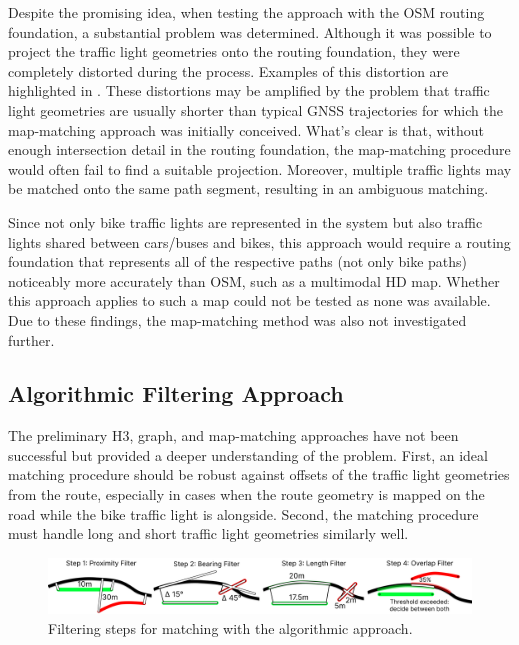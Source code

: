 Despite the promising idea, when testing the approach with the OSM routing foundation, a substantial problem was determined. Although it was possible to project the traffic light geometries onto the routing foundation, they were completely distorted during the process. Examples of this distortion are highlighted in . These distortions may be amplified by the problem that traffic light geometries are usually shorter than typical GNSS trajectories for which the map-matching approach was initially conceived. What's clear is that, without enough intersection detail in the routing foundation, the map-matching procedure would often fail to find a suitable projection. Moreover, multiple traffic lights may be matched onto the same path segment, resulting in an ambiguous matching. 

Since not only bike traffic lights are represented in the system but also traffic lights shared between cars/buses and bikes, this approach would require a routing foundation that represents all of the respective paths (not only bike paths) noticeably more accurately than OSM, such as a multimodal HD map. Whether this approach applies to such a map could not be tested as none was available. Due to these findings, the map-matching method was also not investigated further.

\subsection{Algorithmic Filtering Approach}

The preliminary H3, graph, and map-matching approaches have not been successful but provided a deeper understanding of the problem. First, an ideal matching procedure should be robust against offsets of the traffic light geometries from the route, especially in cases when the route geometry is mapped on the road while the bike traffic light is alongside. Second, the matching procedure must handle long and short traffic light geometries similarly well. 

\begin{figure}[htbp]
\centering
\includegraphics[width=\linewidth]{images/sg-matching-filters.pdf}
\caption{Filtering steps for matching with the algorithmic approach.}
\label{fig:sg-matching-filters}
\end{figure}

